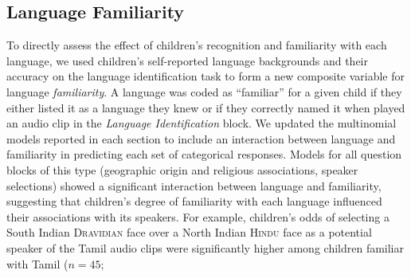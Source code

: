 \documentclass{foushee-adapted-preprint}
\begin{document}
\subsection{Language Familiarity}
To directly assess the effect of children's recognition and familiarity with each language, we used children's self-reported language backgrounds and their accuracy on the language identification task to form a new composite variable for language \textit{familiarity}. 
A language was coded as ``familiar'' for a given child if they either listed it as a language they knew or if they correctly named it when played an audio clip in the \textit{Language Identification} block. %
We updated the multinomial models reported in each section to include an interaction between language %
and familiarity %
in predicting each set of categorical responses. %
Models for all question blocks of this type (geographic origin and religious associations, speaker selections) %
showed a significant interaction between language and familiarity, suggesting that children's degree of familiarity with each language influenced their associations with its speakers. 
For example, children's odds of selecting a South Indian \textsc{Dravidian} face over a North Indian \textsc{Hindu} face as a potential speaker of the Tamil audio clips were significantly higher among children familiar with Tamil ($n=45$; %
\end{document}
